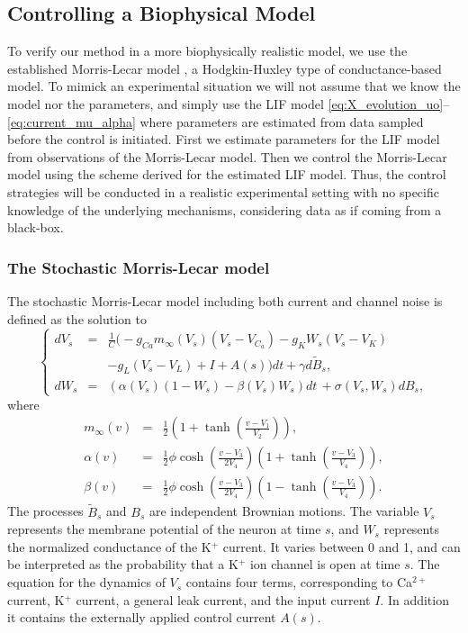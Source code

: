 \subsection{Controlling a Biophysical Model}
\label{sec:morris_lecar_control}
To verify our method in a more biophysically realistic model, we use
the established Morris-Lecar model \cite{MorrisLecar1981}, a
Hodgkin-Huxley type of conductance-based model. To mimick an
experimental situation we will not assume that we know the model nor
the parameters, and simply use the LIF model
\eqref{eq:X_evolution_uo}--\eqref{eq:current_mu_alpha} where
parameters 
are estimated from data sampled before the control is initiated. First we estimate parameters for the LIF
model from observations of the Morris-Lecar model. Then we control the Morris-Lecar
model using the scheme derived for the estimated LIF model. Thus, the
control strategies will be conducted in a realistic experimental
setting with no specific knowledge of the underlying mechanisms,
considering data as if coming from a black-box. 


\subsubsection{The Stochastic Morris-Lecar model}
\def \Vt {{ V_s }} \def \Wt {{ W_s }} \def \Vz {{ V_z}} \def \Wz {{ W_z}}

The stochastic Morris-Lecar model including both current and channel noise is
defined as the solution to
\begin{equation}
\left\{
\begin{array}{ccl}
d\Vt &=& \frac{1}{C}\Big(-g_{Ca}m_\infty(\Vt) (\Vt-V_{C_a}) - g_K\Wt(\Vt-V_K)
\\ && 
-g_L(\Vt-V_L)+I + A(s) \Big)dt +\gamma d\tilde{B}_s,\\
d\Wt&=&\left(\alpha(\Vt)(1-\Wt) - \beta(\Vt)\Wt\right) dt  \, + \sigma(\Vt,\Wt)dB_s,
\end{array}
\right.
\label{eq:ML}
\end{equation}
where 
\begin{eqnarray*}
m_\infty(v)&=&\frac{1}{2}\left(1+\tanh\left(\frac{v-V_1}{V_2}\right)\right),\\
\alpha(v) &=& \frac{1}{2}\phi \cosh\left(\frac{v-V_3}{2V_4}\right)\left(1+\tanh\left(\frac{v-V_3}{V_4}\right)\right),\\
\beta(v) &=& \frac{1}{2}\phi \cosh\left(\frac{v-V_3}{2V_4}\right)\left(1-\tanh\left(\frac{v-V_3}{V_4}\right)\right).
\end{eqnarray*}
The processes $\tilde{B}_s$ and $B_s$ are
independent Brownian motions. The variable $\Vt$ represents the membrane
potential of the neuron at time $s$, and $\Wt$ represents the normalized
conductance of the K$^+$ current. It varies between 0 and 1, and can be
interpreted as the probability that a K$^+$ ion channel is open at
time $s$. The 
equation for the dynamics of $V_s$ contains four terms,
corresponding to Ca$^{2+}$ current, K$^+$ current, a general leak
current, and the
input current $I$. In addition it contains the externally applied control
current $A(s)$.
   
